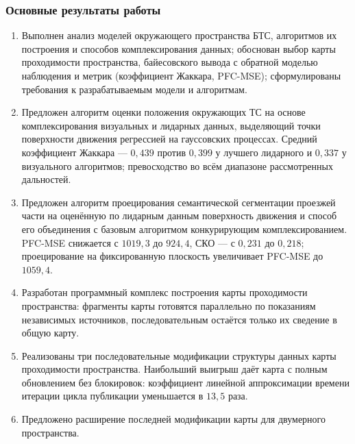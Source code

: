\begin{frame}
    \frametitle{Основные результаты работы}
    \fontsize{7.5}{9}\selectfont
    \begin{enumerate}
        \item Выполнен анализ моделей окружающего пространства БТС, алгоритмов их построения и способов комплексирования данных; обоснован выбор карты проходимости пространства, байесовского вывода с обратной моделью наблюдения и метрик (коэффициент Жаккара, PFC-MSE); сформулированы требования к разрабатываемым модели и алгоритмам.
        \item Предложен алгоритм оценки положения окружающих ТС на основе комплексирования визуальных и лидарных данных, выделяющий точки поверхности движения регрессией на гауссовских процессах. Средний коэффициент Жаккара --- $0,439$ против $0,399$ у лучшего лидарного и $0,337$ у визуального алгоритмов; превосходство во всём диапазоне рассмотренных дальностей.
        \item Предложен алгоритм проецирования семантической сегментации проезжей части на оценённую по лидарным данным поверхность движения и способ его объединения с базовым алгоритмом конкурирующим комплексированием. PFC-MSE снижается с $1019,3$ до $924,4$, СКО --- с $0,231$ до $0,218$; проецирование на фиксированную плоскость увеличивает PFC-MSE до $1059,4$.
        \item Разработан программный комплекс построения карты проходимости пространства: фрагменты карты готовятся параллельно по показаниям независимых источников, последовательным остаётся только их сведение в общую карту.
        \item Реализованы три последовательные модификации структуры данных карты проходимости пространства. Наибольший выигрыш даёт карта с полным обновлением без блокировок: коэффициент линейной аппроксимации времени итерации цикла публикации уменьшается в $13,5$ раза.
        \item Предложено расширение последней модификации карты для двумерного пространства.
    \end{enumerate}
\end{frame}

